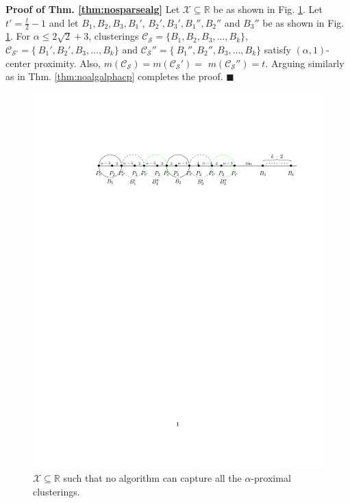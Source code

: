 \documentclass[orivec]{llncs}
\newcommand{\mc}{\mathcal}
\renewcommand{\qed}{\hfill\ensuremath{\blacksquare}}
\begin{document}
\noindent\textbf{Proof of Thm. \ref{thm:nosparsealg}}
Let $\mc X \subseteq \mathbb{R}$ be as shown in Fig. \ref{fig:nosparsealg}. Let $t' = \frac{t}{2}-1$ and let $B_1, B_2, B_3, B_1'$, $B_2', B_3', B_1'', B_2''$ and $B_3''$ be as shown in Fig. \ref{fig:nosparsealg}. For $\alpha \le 2\sqrt{2}+3$, clusterings $\mc C_{\mc S} = \{B_1, B_2, B_3, \ldots, B_k\}$, $\mc C_{\mc S'} = \{\ B_1', B_2', B_3, \ldots, B_k\}$ and $\mc C_{\mc S}'' = \{\ B_1'', B_2'', B_3, \ldots, B_k\}$ satisfy $(\alpha, 1)$-center proximity. Also, $m(\mc C_{\mc S}) = m(\mc C_{\mc S}') =$ $m(\mc C_{\mc S}'') = t$. Arguing similarly as in Thm. \ref{thm:noalgalphacp} completes the proof. \qed\\
\begin{figure}[!t]
\vspace{-5mm}
\begin{center}
\includegraphics[trim={45mm 210mm 20mm 43mm},clip,width=\textwidth]{figures/lbdFig3}
\end{center}
\vspace{-4mm}
\caption{$\mc X \subseteq \mathbb{R}$ such that no algorithm can capture all the $\alpha$-proximal clusterings. } 
\label{fig:nosparsealg}
\end{figure}
\end{document}
